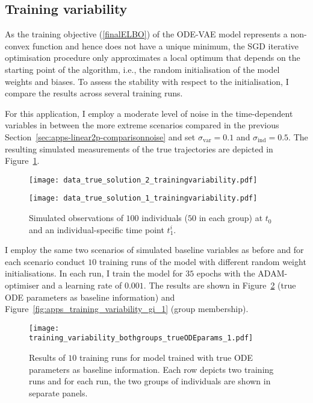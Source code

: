 \subsection{Training variability}\label{sec:apps-linear2ps-trainingvariability}

As the training objective (\ref{finalELBO}) of the ODE-VAE model represents a non-convex function and hence does not have a unique minimum, the SGD iterative optimisation procedure only approximates a local optimum that depends on the starting point of the algorithm, i.e., the random initialisation of the model weights and biases. To assess the stability with respect to the initialisation, I compare the results across several training runs.

For this application, I employ a moderate level of noise in the time-dependent variables in between the more extreme scenarios compared in the previous Section~\ref{sec:apps-linear2p-comparisonnoise} and set $\sigma_{\mathrm{var}} = 0.1$ and $\sigma_{\mathrm{ind}} = 0.5$. The resulting simulated measurements of the true trajectories are depicted in Figure~\ref{fig:data_truesolution_linear2ps_trainingvariability}.
\begin{figure}
	\centering
	\begin{minipage}{.5\linewidth}
		\centering
		\texttt{[image: data\_true\_solution\_2\_trainingvariability.pdf]}
	\end{minipage}\begin{minipage}{.5\linewidth}
		\centering
		\texttt{[image: data\_true\_solution\_1\_trainingvariability.pdf]}
	\end{minipage}
	\caption{Simulated observations of $100$ individuals ($50$ in each group) at $t_0$ and an individual-specific time point $t_1^i$.}
	\label{fig:data_truesolution_linear2ps_trainingvariability}
\end{figure}

I employ the same two scenarios of simulated baseline variables as before and for each scenario conduct $10$ training runs of the model with different random weight initialisations. In each run, I train the model for $35$ epochs with the ADAM-optimiser and a learning rate of $0.001$. The results are shown in Figure~\ref{fig:apps_training_variability_tp_1} (true ODE parameters as baseline information) and Figure~\ref{fig:apps_training_variability_gi_1} (group membership).
\begin{figure}
	\centering
	\texttt{[image: training\_variability\_bothgroups\_trueODEparams\_1.pdf]}
	\caption{Results of $10$ training runs for model trained with true ODE parameters as baseline information. Each row depicts two training runs and for each run, the two groups of individuals are shown in separate panels.}
	\label{fig:apps_training_variability_tp_1}
\end{figure}

